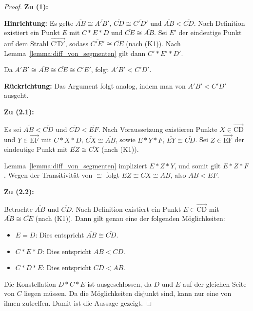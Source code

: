 \documentclass[a4paper,12pt]{article}
\theoremstyle{break}
\begin{document}
\begin{proof}
\textbf{Zu (1):} 

\textbf{Hinrichtung:} Es gelte \(\overline{AB} \cong \overline{A'B'}\), \(\overline{CD} \cong \overline{C'D'}\) und \(\overline{AB} < \overline{CD}\). Nach Definition existiert ein Punkt \(E\) mit \(C * E * D\) und \(\overline{CE} \cong \overline{AB}\). Sei \(E'\) der eindeutige Punkt auf dem Strahl \(\overrightarrow{\mathrm{C'D'}}\), sodass \(\overline{C'E'} \cong \overline{CE}\) (nach (K1)). Nach Lemma~\ref{lemma:diff_von_segmenten} gilt dann \(C' * E' * D'\). 

Da \(\overline{A'B'} \cong \overline{AB} \cong \overline{CE} \cong \overline{C'E'}\), folgt \(\overline{A'B'} < \overline{C'D'}\).

\textbf{Rückrichtung:} Das Argument folgt analog, indem man von \(\overline{A'B'} < \overline{C'D'}\) ausgeht.

\textbf{Zu (2.1):}

Es sei \(\overline{AB} < \overline{CD}\) und \(\overline{CD} < \overline{EF}\). Nach Voraussetzung existieren Punkte \(X \in \overrightarrow{\mathrm{CD}}\) und \(Y \in \overrightarrow{\mathrm{EF}}\) mit \(C * X * D\), \(\overline{CX} \cong \overline{AB}\), sowie \(E * Y * F\), \(\overline{EY} \cong \overline{CD}\). Sei \(Z \in \overrightarrow{\mathrm{EF}}\) der eindeutige Punkt mit \(\overline{EZ} \cong \overline{CX}\) (nach (K1)). 

Lemma~\ref{lemma:diff_von_segmenten} impliziert \(E * Z * Y\), und somit gilt \(E * Z * F\). Wegen der Transitivität von \(\cong\) folgt \(\overline{EZ} \cong \overline{CX} \cong \overline{AB}\), also \(\overline{AB} < \overline{EF}\).

\textbf{Zu (2.2):}

Betrachte \(\overline{AB}\) und \(\overline{CD}\). Nach Definition existiert ein Punkt \(E \in \overrightarrow{\mathrm{CD}}\) mit \(\overline{AB} \cong \overline{CE}\) (nach (K1)). Dann gilt genau eine der folgenden Möglichkeiten:
\begin{itemize}
    \item \(E = D\): Dies entspricht \(\overline{AB} \cong \overline{CD}\).
    \item \(C * E * D\): Dies entspricht \(\overline{AB} < \overline{CD}\).
    \item \(C * D * E\): Dies entspricht \(\overline{CD} < \overline{AB}\).
\end{itemize}

Die Konstellation \(D * C * E\) ist ausgeschlossen, da \(D\) und \(E\) auf der gleichen Seite von \(C\) liegen müssen. Da die Möglichkeiten disjunkt sind, kann nur eine von ihnen zutreffen. Damit ist die Aussage gezeigt.
\end{proof}
\end{document}
